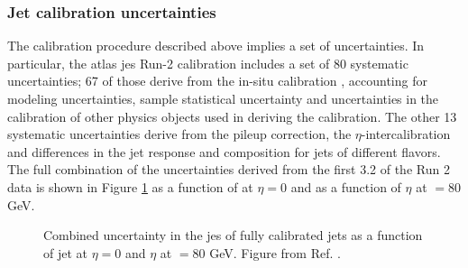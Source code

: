 \subsubsection*{Jet calibration uncertainties}

The calibration procedure described above implies a set of uncertainties. In particular, 
the \gls{atlas} \gls{jes} Run-2 calibration includes a set of 80 systematic uncertainties; 
67 of those derive from the in-situ calibration \cite{PhysRevD.96.072002}, accounting for modeling uncertainties, 
sample statistical uncertainty and uncertainties in the calibration of other physics objects used in deriving the calibration. 
The other 13 systematic uncertainties derive from the pileup correction, the $\eta$-intercalibration 
and differences in the jet response and composition for jets of different flavors. 
The full combination of the uncertainties derived from the first 3.2 \ifb of the Run 2 data 
is shown in Figure \ref{fig:obj:jessyst} as a function of \pt at $\eta = 0$ and as a function of $\eta$ at \pt$ = 80$ GeV.

\begin{figure}[h]
\begin{center}
\end{center}
 \caption{Combined uncertainty in the \gls{jes} of fully calibrated jets as a function of   
 jet \pt at $\eta = 0$ and  $\eta$ at \pt$ = 80$ GeV. Figure from Ref. \cite{PhysRevD.96.072002}.}
  \label{fig:obj:jessyst}
\end{figure}

